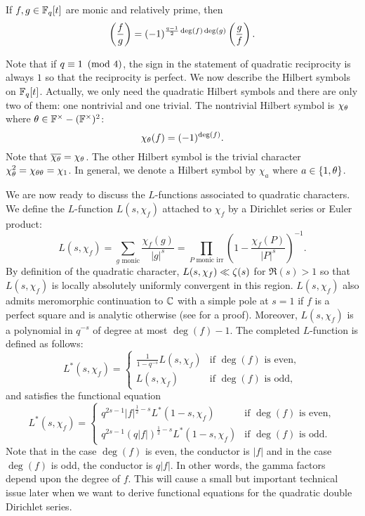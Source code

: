 \documentclass[12pt,reqno,oneside]{amsart}
\begin{document}
    \begin{theorem}
        If $f,g \in \mathbb{F}_{q}[t]$ are monic and relatively prime, then
        \[
            \left(\frac{f}{g}\right) = (-1)^{\frac{q-1}{2}\deg(f)\deg(g)}\left(\frac{g}{f}\right).
        \]
    \end{theorem}

    Note that if $q \equiv 1 \ \left(\text{mod }4\right)$, the sign in the statement of quadratic reciprocity is always $1$ so that the reciprocity is perfect. We now describe the Hilbert symbols on $\mathbb{F}_{q}[t]$. Actually, we only need the quadratic Hilbert symbols and there are only two of them: one nontrivial and one trivial. The nontrivial Hilbert symbol is $\chi_{\theta}$ where $\theta \in \mathbb{F}^{\times}-(\mathbb{F}^{\times})^{2}$:
    \[
        \chi_{\theta}(f) = (-1)^{\deg(f)}.
    \]
    Note that $\overline{\chi_{\theta}} = \chi_{\theta}$. The other Hilbert symbol is the trivial character $\chi_{\theta}^{2} = \chi_{\theta\theta} = \chi_{1}$. In general, we denote a Hilbert symbol by $\chi_{a}$ where $a \in \{1,\theta\}$.

    We are now ready to discuss the $L$-functions associated to quadratic characters. We define the $L$-function $L(s,\chi_{f})$ attached to $\chi_{f}$ by a Dirichlet series or Euler product:
    \[
        L(s,\chi_{f}) = \sum_{\text{$g$ monic}}\frac{\chi_{f}(g)}{|g|^{s}} = \prod_{\text{$P$ monic irr}}\left(1-\frac{\chi_{f}(P)}{|P|^{s}}\right)^{-1}.
    \]
    By definition of the quadratic character, $L(s,\chi_{f}) \ll \zeta(s)$ for $\Re(s) > 1$ so that $L(s,\chi_{f})$ is locally absolutely uniformly convergent in this region. $L(s,\chi_{f})$ also admits meromorphic continuation to $\mathbb{C}$ with a simple pole at $s = 1$ if $f$ is a perfect square and is analytic otherwise (see \cite{R} for a proof). Moreover, $L(s,\chi_{f})$ is a polynomial in $q^{-s}$ of degree at most $\deg(f)-1$. The completed $L$-function is defined as follows:
    \[
        L^{\ast}(s,\chi_{f}) = \begin{cases} \frac{1}{1-q^{-s}}L(s,\chi_{f}) & \text{if $\deg(f)$ is even}, \\ L(s,\chi_{f}) & \text{if $\deg(f)$ is odd}, \end{cases}
    \]
    and satisfies the functional equation
    \[
        L^{\ast}(s,\chi_{f}) = \begin{cases} q^{2s-1}|f|^{\frac{1}{2}-s}L^{\ast}(1-s,\chi_{f}) & \text{if $\deg(f)$ is even}, \\ q^{2s-1}(q|f|)^{\frac{1}{2}-s}L^{\ast}(1-s,\chi_{f}) & \text{if $\deg(f)$ is odd}. \end{cases}
    \]
    Note that in the case $\deg(f)$ is even, the conductor is $|f|$ and in the case $\deg(f)$ is odd, the conductor is $q|f|$. In other words, the gamma factors depend upon the degree of $f$. This will cause a small but important technical issue later when we want to derive functional equations for the quadratic double Dirichlet series.
\end{document}
